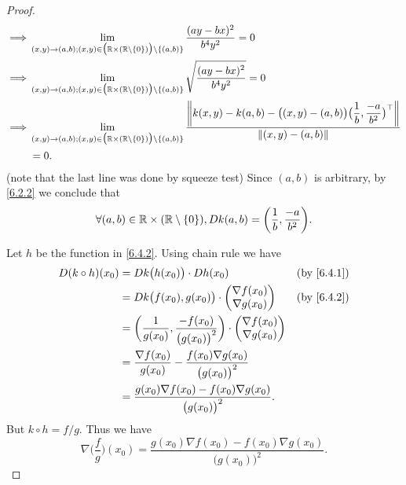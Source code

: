 \begin{proof}
\begin{align*}
    \implies & \lim_{(x, y) \to (a, b) ; (x, y) \in \big(\R \times (\R \setminus \set{0})\big) \setminus \set{(a, b)}} \dfrac{(ay - bx)^2}{b^4 y^2} = 0                                                                                                    \\
    \implies & \lim_{(x, y) \to (a, b) ; (x, y) \in \big(\R \times (\R \setminus \set{0})\big) \setminus \set{(a, b)}} \sqrt{\dfrac{(ay - bx)^2}{b^4 y^2}} = 0                                                                                             \\
    \implies & \lim_{(x, y) \to (a, b) ; (x, y) \in \big(\R \times (\R \setminus \set{0})\big) \setminus \set{(a, b)}} \dfrac{\norm*{k(x, y) - k(a, b) - \big((x, y) - (a, b)\big) \big(\dfrac{1}{b}, \dfrac{-a}{b^2}\big)^\top}}{\norm*{(x, y) - (a, b)}} \\
             & = 0.
  \end{align*}
  (note that the last line was done by squeeze test)
  Since \((a, b)\) is arbitrary, by \cref{6.2.2} we conclude that
  \[
    \forall (a, b) \in \R \times (\R \setminus \set{0}), D k(a, b) = \bigg(\dfrac{1}{b}, \dfrac{-a}{b^2}\bigg).
  \]

  Let \(h\) be the function in \cref{6.4.2}.
  Using chain rule we have
  \begin{align*}
    D (k \circ h)(x_0) & = D k\big(h(x_0)\big) \cdot D h(x_0)                                                       &  & \by{6.4.1} \\
                       & = D k\big(f(x_0), g(x_0)\big) \cdot \begin{pmatrix}
                                                               \nabla f(x_0) \\
                                                               \nabla g(x_0)
                                                             \end{pmatrix}                                        &  & \by{6.4.2}   \\
                       & = \bigg(\dfrac{1}{g(x_0)}, \dfrac{-f(x_0)}{\big(g(x_0)\big)^2}\bigg) \cdot \begin{pmatrix}
                                                                                                      \nabla f(x_0) \\
                                                                                                      \nabla g(x_0)
                                                                                                    \end{pmatrix}                  \\
                       & = \dfrac{\nabla f(x_0)}{g(x_0)} - \dfrac{f(x_0) \nabla g(x_0)}{\big(g(x_0)\big)^2}                         \\
                       & = \dfrac{g(x_0) \nabla f(x_0) - f(x_0) \nabla g(x_0)}{\big(g(x_0)\big)^2}.
  \end{align*}
  But \(k \circ h = f / g\).
  Thus we have
  \[
    \nabla \bigg(\dfrac{f}{g}\bigg)(x_0) = \dfrac{g(x_0) \nabla f(x_0) - f(x_0) \nabla g(x_0)}{\big(g(x_0)\big)^2}.
  \]
\end{proof}

